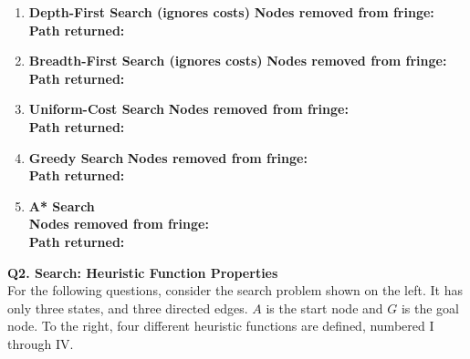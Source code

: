 \begin{enumerate}
\item {\bf Depth-First Search (ignores costs)}
\vfill
  \textbf{Nodes removed from fringe:} \\
  \textbf{Path returned:} \\
\item {\bf Breadth-First Search (ignores costs)}
\vfill
  \textbf{Nodes removed from fringe: } \\
  \textbf{Path returned: }  \\
\item {\bf Uniform-Cost Search}
\vfill
  \textbf{Nodes removed from fringe: } \\
  \textbf{Path returned: }  \\
\item {\bf Greedy Search} 
\vfill
  \textbf{Nodes removed from fringe: } \\
  \textbf{Path returned: }  \\
\item {\bf A* Search} \\
  \textbf{Nodes removed from fringe: } \\
  \textbf{Path returned: }  \\
\end{enumerate}	



\newpage

\textbf{Q2. Search: Heuristic Function Properties} \\

For the following questions, consider the search problem shown on the left.
It has only three states, and three directed edges.
$A$ is the start node and $G$ is the goal node.
To the right, four different heuristic functions are defined, numbered I through IV.

